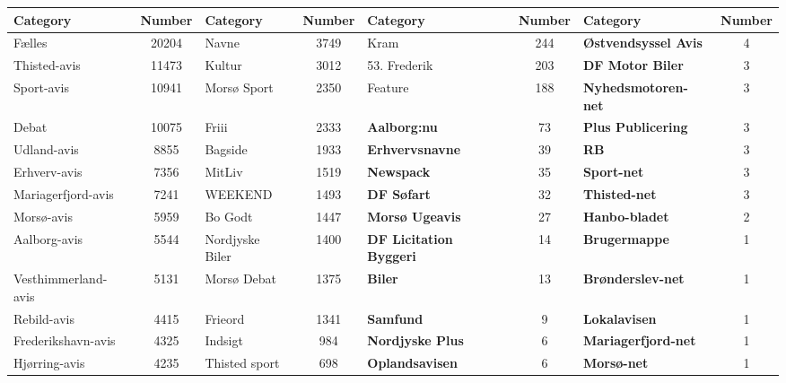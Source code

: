 \begin{table}[h]
	\centering
	\begin{tabular}{l|c|l|c|l|c|l|c}
		Category            & Number & Category        & Number & Category                       & Number & Category                    & Number \\
		\toprule
		Fælles              & 20204  & Navne           &  3749  & Kram                           &  244   & \textbf{Østvendsyssel Avis} &   4    \\
		Thisted-avis        & 11473  & Kultur          &  3012  & 53. Frederik                   &  203   & \textbf{DF Motor Biler}     &   3    \\
		Sport-avis          & 10941  & Morsø Sport     &  2350  & Feature                        &  188   & \textbf{Nyhedsmotoren-net}  &   3    \\
		Debat               & 10075  & Friii           &  2333  & \textbf{Aalborg:nu}            &   73   & \textbf{Plus Publicering}   &   3    \\
		Udland-avis         &  8855  & Bagside         &  1933  & \textbf{Erhvervsnavne}         &   39   & \textbf{RB}                 &   3    \\
		Erhverv-avis        &  7356  & MitLiv          &  1519  & \textbf{Newspack}              &   35   & \textbf{Sport-net}          &   3    \\
		Mariagerfjord-avis  &  7241  & WEEKEND         &  1493  & \textbf{DF Søfart}             &   32   & \textbf{Thisted-net}        &   3    \\
		Morsø-avis          &  5959  & Bo Godt         &  1447  & \textbf{Morsø Ugeavis}         &   27   & \textbf{Hanbo-bladet}       &   2    \\
		Aalborg-avis        &  5544  & Nordjyske Biler &  1400  & \textbf{DF Licitation Byggeri} &   14   & \textbf{Brugermappe}        &   1    \\
		Vesthimmerland-avis &  5131  & Morsø Debat     &  1375  & \textbf{Biler}                 &   13   & \textbf{Brønderslev-net}    &   1    \\
		Rebild-avis         &  4415  & Frieord         &  1341  & \textbf{Samfund}               &   9    & \textbf{Lokalavisen}        &   1    \\
		Frederikshavn-avis  &  4325  & Indsigt         &  984   & \textbf{Nordjyske Plus}        &   6    & \textbf{Mariagerfjord-net}  &   1    \\
		Hjørring-avis       &  4235  & Thisted sport   &  698   & \textbf{Oplandsavisen}         &   6    & \textbf{Morsø-net}          &   1    \\

\end{tabular}
\end{table}
